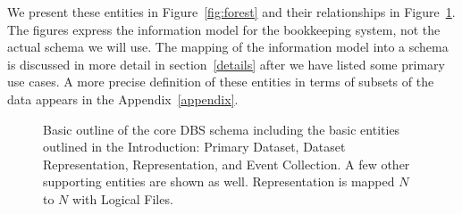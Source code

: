 \documentclass{cmspaper}
\begin{document}
We present these entities in Figure~\ref{fig:forest} and their relationships
in Figure~\ref{fig:highlevel}.  The figures express the information model
for the bookkeeping system, not the actual schema we will use.
The mapping of the information model into a schema is discussed in more
detail in section~\ref{details} after we have listed some primary use
cases.  A more precise definition of these entities in terms of subsets of
the data appears in the Appendix~\ref{appendix}.

\begin{figure}[hbtp]
  \begin{center}
    \caption{Basic outline of the core DBS schema including the basic entities outlined 
in the Introduction: Primary Dataset, Dataset Representation, Representation, 
and Event Collection.  A few other supporting entities are shown as well.  Representation 
is mapped $N$ to $N$ with Logical Files. }
    \label{fig:highlevel}
  \end{center}
\end{figure}
\end{document}
